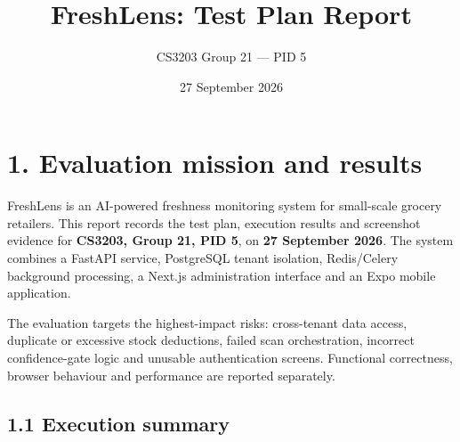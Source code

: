 \documentclass[
  11pt,
]{article}
\title{FreshLens: Test Plan Report}
\author{CS3203 Group 21 --- PID 5}
\date{27 September 2026}
\begin{document}
\maketitle

{
\setcounter{tocdepth}{1}
\tableofcontents
}
\section{1. Evaluation mission and
results}\label{evaluation-mission-and-results}

FreshLens is an AI-powered freshness monitoring system for small-scale
grocery retailers. This report records the test plan, execution results
and screenshot evidence for \textbf{CS3203, Group 21, PID 5}, on
\textbf{27 September 2026}. The system combines a FastAPI service,
PostgreSQL tenant isolation, Redis/Celery background processing, a
Next.js administration interface and an Expo mobile application.

The evaluation targets the highest-impact risks: cross-tenant data
access, duplicate or excessive stock deductions, failed scan
orchestration, incorrect confidence-gate logic and unusable
authentication screens. Functional correctness, browser behaviour and
performance are reported separately.

\subsection{1.1 Execution summary}\label{execution-summary}
\end{document}
